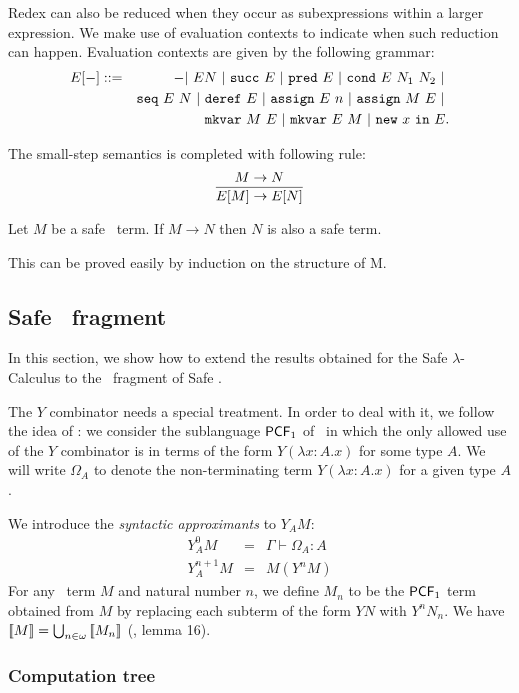Redex can also be reduced when they occur as subexpressions within a
larger expression. We make use of evaluation contexts to indicate
when such reduction can happen. Evaluation contexts are given by the
following grammar:
\begin{eqnarray*}
E[-] &::=& - |\ E N\ |\ \pcfsucc\ E\ |\ \pcfpred\ E\ |\ \pcfcond\ E\ N_1\ N_2\ |\ \\
&&    \iaseq\ E\ N\ |\ \iaderef\ E\ |\ \iaassign\ E\ n\ |\ \iaassign\ M\ E \ |\ \\
&&    \iamkvar\ M\ E\ |\ \iamkvar\ E\ M\ |\ \ianewin{x}\ E  .
\end{eqnarray*}

The small-step semantics is completed with following rule:
$$ \frac{\displaystyle M \rightarrow N}{E[M] \rightarrow E[N]} $$

\begin{lem}
\label{lem:ia_safety_preserved} Let $M$ be a safe \ialgol\ term. If
$M \rightarrow N$ then $N$ is also a safe term.
\end{lem}
This can be proved easily by induction on the structure of M.


\subsection{Safe \pcf\ fragment}
In this section, we show how to extend the results obtained for the
Safe $\lambda$-Calculus to the \pcf\ fragment of Safe \ialgol.

The $Y$ combinator needs a special treatment. In order to deal with
it, we follow the idea of \cite{abramsky:game-semantics-tutorial}:
we consider the sublanguage $\textsf{PCF}_1$ of \pcf\ in which the only
allowed use of the $Y$ combinator is in terms of the form $Y(
\lambda x:A .x )$ for some type $A$. We will write $\Omega_A$ to
denote the non-terminating term $Y(\lambda x:A .x)$ for a given type
$A$.

We introduce the \emph{syntactic approximants} to $Y_A M$:
\begin{eqnarray*}
Y^0_A M &=& \Gamma \vdash \Omega_A : A\\
Y^{n+1}_A M &=& M( Y^n M )
\end{eqnarray*}
For any \pcf\ term $M$ and natural number $n$, we define $M_n$ to be
the $\textsf{PCF}_1$ term obtained from $M$ by replacing each subterm of the
form $Y N$ with $Y^n N_n$. We have ${[\![ M ]\!]} = \bigcup_{n\in\omega}
{[\![ M_n ]\!]}$ (\cite{abramsky:game-semantics-tutorial}, lemma 16).


\subsubsection{Computation tree}

